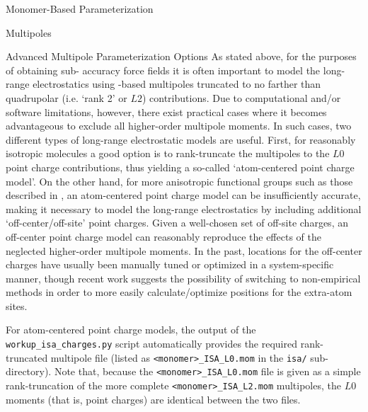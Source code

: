 \begin{section}{Monomer-Based Parameterization}
\begin{subsection}{Multipoles}
\begin{subsubsection}{Advanced Multipole Parameterization Options}
As stated above, for the purposes of obtaining sub-\kjmol{} accuracy
force fields it is often important to model the long-range electrostatics
using \isa-based multipoles truncated to no farther than quadrupolar (i.e. `rank 2' or
$L2$)\cite{stone2013theory} contributions.
Due to computational and/or software limitations, however, there exist
practical cases where it becomes advantageous to exclude all higher-order
multipole moments.\cite{Cardamone2014} In such cases, 
two different types of long-range electrostatic models are useful. First, for
reasonably isotropic molecules a good option is to rank-truncate the \isa
multipoles to the $L0$ point charge contributions, thus yielding a so-called `atom-centered
point charge model'. On the other hand, for more anisotropic functional groups such as those
described in , an atom-centered point charge model can be
insufficiently accurate, making it 
necessary to model the long-range electrostatics by including additional 
`off-center/off-site' point charges. Given a well-chosen set of off-site charges, 
an off-center point charge model can reasonably reproduce the effects of the
neglected higher-order multipole moments.\cite{Dixon1997}
In the past, locations for the off-center charges have usually been manually tuned or optimized
in a system-specific manner, though recent work suggests the
possibility of switching to non-empirical methods in order to more easily calculate/optimize 
positions for the extra-atom sites.\cite{Chaudret2013,Unke2017} 

For atom-centered point charge models, the output of the
\verb|workup_isa_charges.py| script automatically provides the required
rank-truncated multipole file (listed as \verb|<monomer>_ISA_L0.mom| in the \verb|isa/|
sub-directory). Note that, because the \verb|<monomer>_ISA_L0.mom| file is given as a
simple rank-truncation of the more complete \verb|<monomer>_ISA_L2.mom|
multipoles, the $L0$ moments (that is, point charges) are identical between the two files.


\end{subsubsection}
\end{subsection}
\end{section}
